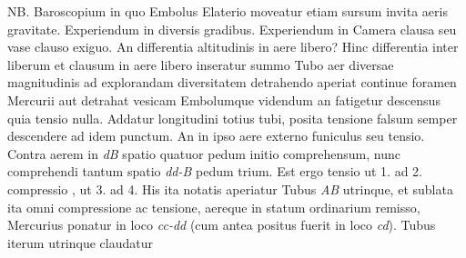 {                 %
                NB. Baroscopium\protect{} in quo Embolus\protect{} Elaterio\protect{} moveatur etiam sursum invita aeris gravitate\protect{}.
                     Experiendum in diversis gradibus. Experiendum in Camera clausa seu vase clauso exiguo. An 
                      differentia altitudinis in aere libero? Hinc differentia inter liberum et clausum in aere libero inseratur summo Tubo aer diversae magnitudinis ad explorandam diversitatem detrahendo aperiat continue foramen Mercurii\protect{} aut detrahat vesicam Embolumque\protect{} videndum an fatigetur  descensus quia tensio\protect{} nulla. Addatur longitudini totius tubi, posita tensione\protect{} falsum semper descendere ad idem punctum. An in ipso aere externo funiculus\protect{} seu tensio\protect{}. }
                    Contra aerem  in \textit{dB} spatio quatuor pedum initio comprehensum, nunc comprehendi tantum spatio \textit{dd-B} pedum trium. Est ergo tensio\protect{}  ut 1. ad 2. compressio\protect{} , ut 3. ad 4. His ita notatis aperiatur Tubus \textit{AB} utrinque, et sublata ita omni compressione\protect{} ac tensione\protect{}, aereque in statum ordinarium remisso, Mercurius\protect{} ponatur in loco \textit{cc-dd} (cum antea positus fuerit in loco \textit{cd}). Tubus iterum utrinque claudatur  %
